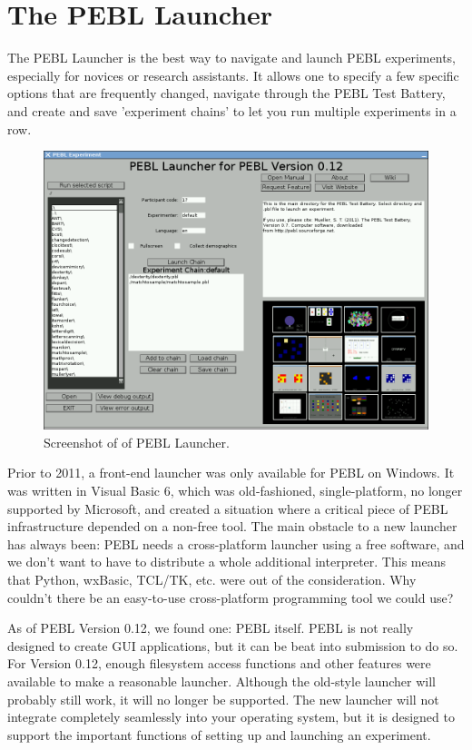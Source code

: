 
\chapter
{The PEBL Launcher}

The PEBL Launcher is the best way to navigate and launch PEBL
experiments, especially for novices or research assistants.  It allows
one to specify a few specific options that are frequently changed,
navigate through the PEBL Test Battery, and create and save
'experiment chains' to let you run multiple experiments in a row.

\begin{figure}[h]
\caption{Screenshot of of PEBL Launcher.}
\center
\includegraphics[scale=.35]{launcher.png} 
\end{figure}
\clearpage
{}
Prior to 2011, a front-end launcher was only available for PEBL on
Windows.  It was written in Visual Basic 6, which was old-fashioned,
single-platform, no longer supported by Microsoft, and created a
situation where a critical piece of PEBL infrastructure depended on a
non-free tool.  The main obstacle to a new launcher has always been:
PEBL needs a cross-platform launcher using a free software, and we
don't want to have to distribute a whole additional interpreter.  This
means that Python, wxBasic, TCL/TK, etc. were out of the
consideration.  Why couldn't there be an easy-to-use cross-platform
programming tool we could use?

As of PEBL Version 0.12, we found one: PEBL itself.  PEBL is not
really designed to create GUI applications, but it can be beat into
submission to do so.  For Version 0.12, enough filesystem access
functions and other features were available to make a reasonable
launcher.  Although the old-style launcher will probably still work,
it will no longer be supported.  The new launcher will not integrate
completely seamlessly into your operating system, but it is designed
to support the important functions of setting up and launching an
experiment.

